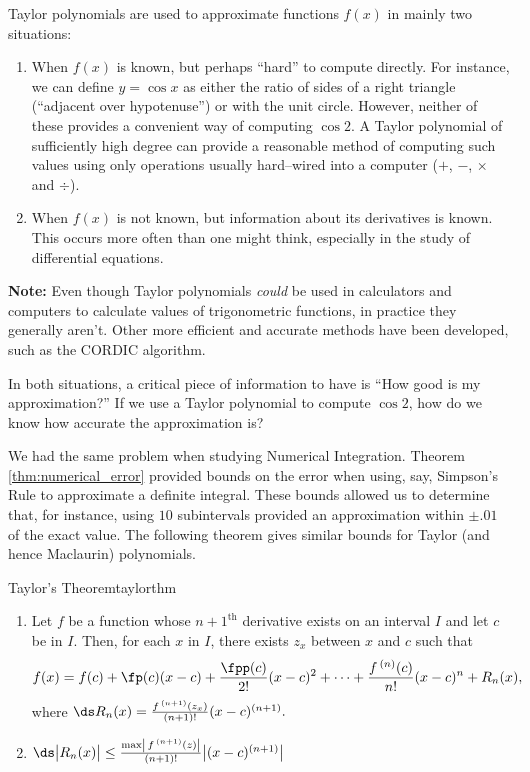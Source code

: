 %
Taylor polynomials are used to approximate functions $f(x)$ in mainly two situations:
	\begin{enumerate}
	\item		When $f(x)$ is known, but perhaps ``hard'' to compute directly. For instance, we can define $y=\cos x$ as either the ratio of sides of a right triangle (``adjacent over hypotenuse'') or with the unit circle. However, neither of these provides a convenient way of computing $\cos 2$. A Taylor polynomial of sufficiently high degree can provide a reasonable method of computing such values using only operations usually hard--wired into a computer ($+$, $-$, $\times$ and $\div$).
	
	\item		When $f(x)$ is not known, but information about its derivatives is known. This occurs more often than one might think, especially in the study of differential equations.
	\end{enumerate}

{\textbf{Note:} Even though Taylor polynomials \emph{could} be used in calculators and computers to calculate values of trigonometric functions, in practice they generally aren't. Other more efficient and accurate methods have been developed, such as the CORDIC algorithm.}
	
In both situations, a critical piece of information to have is ``How good is my approximation?'' If we use a Taylor polynomial to compute $\cos 2$, how do we know how accurate the approximation is? 

We had the same problem when studying Numerical Integration. Theorem \ref{thm:numerical_error} provided bounds on the error when using, say, Simpson's Rule to approximate a definite integral. These bounds allowed us to determine that, for instance, using $10$ subintervals provided an approximation within $\pm .01$ of the exact value. The following theorem gives similar bounds for Taylor (and hence Maclaurin) polynomials. 

\begin{theorem}{Taylor's Theorem}{taylorthm}
{\begin{enumerate}
\item	Let $f$ be a function whose $n+1^\text{th}$ derivative exists on an interval $I$ and let $c$ be in $I$. Then, for each $x$ in $I$, there exists $z_x$ between $x$ and $c$ such that
$$f(x) = f(c) + \fp(c)(x-c) + \frac{\fpp(c)}{2!}(x-c)^2+ \cdots +\frac{f\,^{(n)}(c)}{n!}(x-c)^n+R_n(x),$$
where $\ds R_n(x) = \frac{f\,^{(n+1)}(z_x)}{(n+1)!}(x-c)^{(n+1)}.$

\item		$\ds \big|R_n(x)\big| \leq \frac{\max\left|\,f\,^{(n+1)}(z)\right|}{(n+1)!}\big|(x-c)^{(n+1)}\big|$
\end{enumerate}
}
\end{theorem}

